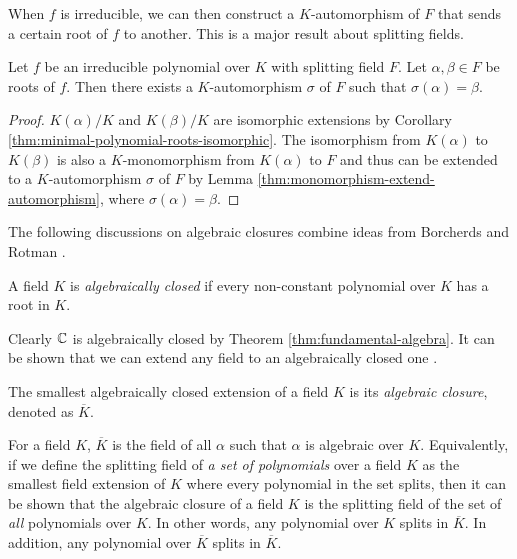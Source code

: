 When $f$ is irreducible, we can then construct a $K$-automorphism of $F$ that sends a certain root of $f$ to another. This is a major result about splitting fields. 

\begin{theorem} \label{thm:automorphism-from-zeros}
	Let $f$ be an irreducible polynomial over $K$ with splitting field $F$. Let $\alpha, \beta \in F$ be roots of $f$. Then there exists a $K$-automorphism $\sigma$ of $F$ such that $\sigma(\alpha) = \beta$. 
\end{theorem}

\begin{proof}
	$K(\alpha)/K$ and $K(\beta)/K$ are isomorphic extensions by Corollary \ref{thm:minimal-polynomial-roots-isomorphic}. The isomorphism from $K(\alpha)$ to $K(\beta)$ is also a $K$-monomorphism from $K(\alpha)$ to $F$ and thus can be extended to a $K$-automorphism $\sigma$ of $F$ by Lemma \ref{thm:monomorphism-extend-automorphism}, where $\sigma(\alpha) = \beta$.
\end{proof}

The following discussions on algebraic closures combine ideas from Borcherds \cite[Lecture~4]{galois-theory-lectures} and Rotman \cite[p.~89]{rotman_galois_1998}. 

\begin{definition}
	A field $K$ is \textit{algebraically closed} if every non-constant polynomial over $K$ has a root in $K$. 
\end{definition}

Clearly $\mathbb C$ is algebraically closed by Theorem \ref{thm:fundamental-algebra}. It can be shown that we can extend any field to an algebraically closed one \cite[p.~89]{rotman_galois_1998}. 

\begin{definition}
	The smallest algebraically closed extension of a field $K$ is its \textit{algebraic closure}, denoted as $\overline K$.
\end{definition}



For a field $K$, $\overline K$ is the field of all $\alpha$ such that $\alpha$ is algebraic over $K$. Equivalently, if we define the splitting field of \textit{a set of polynomials} over a field $K$ as the smallest field extension of $K$ where every polynomial in the set splits, then it can be shown that the algebraic closure of a field $K$ is the splitting field of the set of \textit{all} polynomials over $K$. In other words, any polynomial over $K$ splits in $\overline K$. In addition, any polynomial over $\overline K$ splits in $\overline K$.

